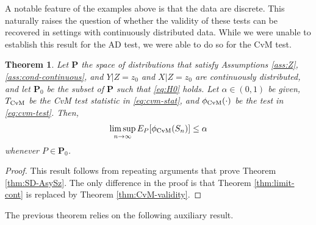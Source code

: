 \documentclass[11pt]{article}
\numberwithin{equation}{section}
\newtheorem{theorem}{Theorem}%
\begin{document}
A notable feature of the examples above is that the data are discrete. This naturally raises the question of whether the validity of these tests can be recovered in settings with continuously distributed data. While we were unable to establish this result for the AD test, we were able to do so for the CvM test.

\begin{theorem}\label{thm:SD-AsySz_CvM}
Let $\mathbf P$ the space of distributions that satisfy Assumptions \ref{ass:Z}, \ref{ass:cond-continuous}, and $Y|Z=z_0$ and $X|Z=z_0$ are continuously distributed, and let $\mathbf P_{0}$ be the subset of $\mathbf P$ such that \eqref{eq:H0} holds. Let $\alpha\in(0,1)$ be given, $T_{\rm CvM}$ be the CvM test statistic in \eqref{eq:cvm-stat}, and $\phi_{\rm CvM}(\cdot)$ be the test in \eqref{eq:cvm-test}. Then, 
  \begin{equation} \label{eq:Asysize_cvm}
    \limsup_{n \to \infty} E_{P}[\phi_{\rm CvM}(S_n)]\le \alpha
  \end{equation}
  whenever $P \in \mathbf P_{0}$.
\end{theorem}
\begin{proof}
    This result follows from repeating arguments that prove Theorem \ref{thm:SD-AsySz}. The only difference in the proof is that Theorem \ref{thm:limit-cont} is replaced by Theorem \ref{thm:CvM-validity}. 
\end{proof}

The previous theorem relies on the following auxiliary result. 
\end{document}
